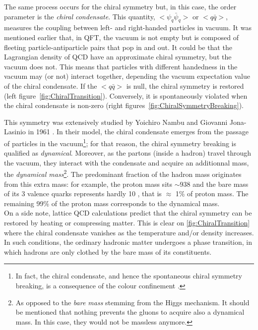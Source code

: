 The same process occurs for the chiral symmetry but, in this case, the order parameter is the \textit{chiral condensate}. This quantity, $< \psi_{q} \bar{\psi}_{q} > $ or $ < q \bar{q} >$, measures the coupling between left- and right-handed particles in vacuum. It was mentioned earlier that, in QFT, the vacuum is not empty but is composed of fleeting particle-antiparticle pairs that pop in and out. It could be that the Lagrangian density of QCD have an approximate chiral symmetry, but the vacuum does not. This means that particles with different handedness in the vacuum may (or not) interact together, depending the vacuum expectation value of the chiral condensate. If the $ < q \bar{q} >$ is null, the chiral symmetry is restored (left figure~\ref{fig:ChiralTransition}). Conversely, it is spontaneously violated when the chiral condensate is non-zero (right figures~\ref{fig:ChiralSymmetryBreaking}).

This symmetry was extensively studied by Yoichiro Nambu and Giovanni Jona-Lasinio in 1961 \cite{nambuDynamicalModelElementary1961}. In their model, the chiral condensate emerges from the passage of particles in the vacuum\footnote{In fact, the chiral condensate, and hence the spontaneous chiral symmetry breaking, is a consequence of the colour confinement \cite{peskinIntroductionQuantumField2018}.}; for that reason, the chiral symmetry breaking is qualified as \textit{dynamical}. Moreover, as the partons (inside a hadron) travel through the vacuum, they interact with the condensate and acquire an additionnal mass, the \textit{dynamical mass}\footnote{As opposed to the \textit{bare mass} stemming from the Higgs mechanism. It should be mentioned that nothing prevents the gluons to acquire also a dynamical mass. In this case, they would not be massless anymore.}. The predominant fraction of the hadron mass originates from this extra mass: for example, the proton mass sits $\sim 938$ \mmass and the bare mass of its 3 valence quarks represents hardly 10 \mmass, that is $\approx$ 1\% of proton mass. The remaining 99\% of the proton mass corresponds to the dynamical mass.\\

On a side note, lattice QCD calculations predict that the chiral symmetry can be restored by heating or compressing matter. This is clear on \fig\ref{fig:ChiralTransition} where the chiral condensate vanishes as the temperature and/or density increases. In such conditions, the ordinary hadronic matter undergoes a phase transition, in which hadrons are only clothed by the bare mass of its constituents.

